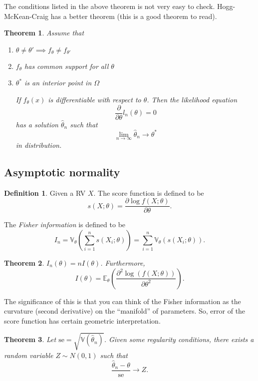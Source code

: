 \documentclass[
  openany]{book}
\newtheorem{theorem}{Theorem}[chapter]
\theoremstyle{definition}
\newtheorem{definition}{Definition}[chapter]
\theoremstyle{definition}
\theoremstyle{definition}
\theoremstyle{definition}
\theoremstyle{remark}
\begin{document}
The conditions listed in the above theorem is not very easy to check.
Hogg-McKean-Craig has a better theorem (this is a good theorem to read).

\begin{theorem}

Assume that

\begin{enumerate}
\def\labelenumi{\arabic{enumi}.}
\item
  \(\theta \not = \theta' \implies f_\theta \not = f_{\theta'}\)
\item
  \(f_\theta\) has common support for all \(\theta\)
\item
  \(\theta^*\) is an interior point in \(\Omega\)

  If \(f_\theta(x)\) is differentiable with respect to \(\theta\).
  Then the likelihood equation
  \[ \frac{\partial}{\partial \theta}  l_n(\theta) = 0 \]
  has a solution \(\hat \theta_n\) such that
  \[\lim_{n\to \infty} \hat \theta_n \to \theta^*\] in distribution.
\end{enumerate}

\end{theorem}

\subsection{Asymptotic normality}\label{asymptotic-normality}

\begin{definition}
Given a RV \(X\).
The score function is defined to be
\[ s (X;\theta) = \frac{\partial \log f(X; \theta)}{\partial \theta} .\]

The \emph{Fisher information} is defined to be
\[ I_n = \mathbb{V}_\theta \left( \sum_{i=1}^n s(X_i; \theta)  \right) = \sum_{i=1}^n \mathbb{V}_\theta \left( s(X_i; \theta)  \right).\]
\end{definition}

\begin{theorem}
\(I_n (\theta) = n I(\theta)\).
Furthermore,
\[ I(\theta) = \mathbb{E}_\theta \left( \frac{\partial^2 \log(f(X;\theta))}{\partial \theta^2} \right).\]
\end{theorem}

The significance of this is that you can think of
the Fisher information as the curvature (second derivative) on the ``manifold''
of parameters.
So, error of the score function has certain geometric interpretation.

\begin{theorem}
Let \(\mathrm{se} = \sqrt{\mathbb{V}(\hat \theta_n)}\).
Given some regularity conditions,
there exists a random variable \(Z \sim N(0,1)\) such that
\[\frac{\hat\theta_n - \theta}{\mathrm{se}} \to Z.\]
\end{theorem}
\end{document}

